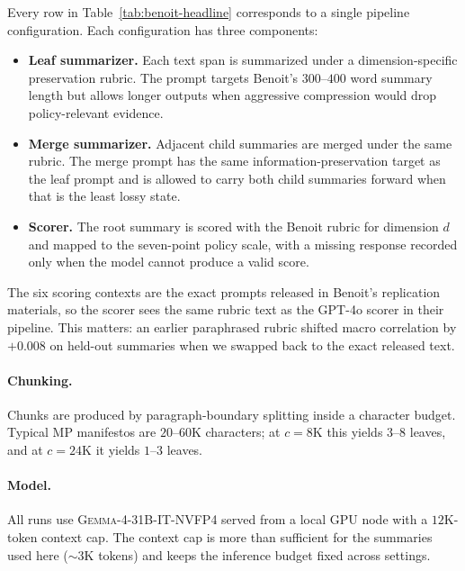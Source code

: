 Every row in Table~\ref{tab:benoit-headline} corresponds to a single
pipeline configuration. Each configuration has three components:

\begin{itemize}[leftmargin=1.5em]
    \item \textbf{Leaf summarizer.} Each text span is summarized under
          a dimension-specific preservation rubric. The prompt targets
          Benoit's $300$--$400$ word summary length but allows longer
          outputs when aggressive compression would drop policy-relevant
          evidence.
    \item \textbf{Merge summarizer.} Adjacent child summaries are merged
          under the same rubric. The merge prompt has the same
          information-preservation target as the leaf prompt and is
          allowed to carry both child summaries forward when that is the
          least lossy state.
    \item \textbf{Scorer.} The root summary is scored with the Benoit
          rubric for dimension $d$ and mapped to the seven-point policy
          scale, with a missing response recorded only when the model
          cannot produce a valid score.
\end{itemize}

The six scoring contexts are the exact prompts released in Benoit's
replication materials, so the scorer sees the same rubric text as the
GPT-4o scorer in their pipeline. This matters: an earlier paraphrased
rubric shifted macro correlation by $+0.008$ on held-out summaries when
we swapped back to the exact released text.

\paragraph{Chunking.} Chunks are produced by
paragraph-boundary splitting inside a character budget. Typical MP
manifestos are $20$--$60$K characters; at $c = 8\mathrm{K}$ this yields
$3$--$8$ leaves, and at $c = 24\mathrm{K}$ it yields $1$--$3$ leaves.

\paragraph{Model.} All runs use
\textsc{Gemma-4-31B-IT-NVFP4} served from a local GPU node with a
$12\mathrm{K}$-token context cap. The context cap is more than
sufficient for the summaries used here ($\sim\!3\mathrm{K}$ tokens)
and keeps the inference budget fixed across settings.

